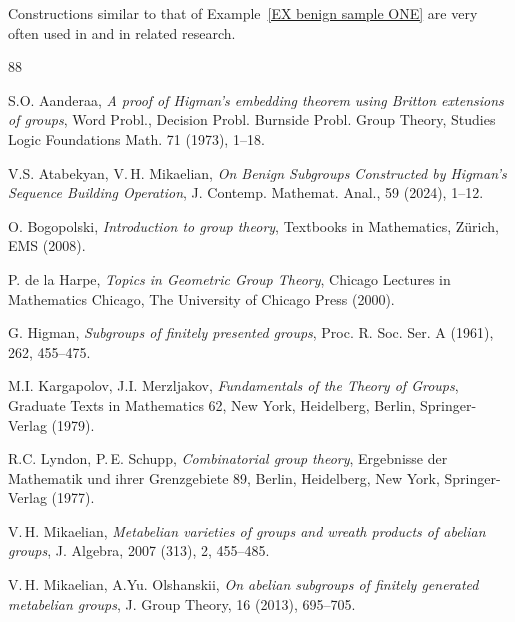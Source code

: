 \documentclass[12pt, a4paper]{amsart}
\newcommand{\1}{\{1\}}
\theoremstyle{plain}
\theoremstyle{definition}
\theoremstyle{remark}
\numberwithin{equation}{section}
\begin{document}
Constructions similar to that of
Example~\ref{EX benign sample ONE} are very often used in \cite{A modified proof for Higman, 
On explicit embeddings of Q,
An explicit algorithm} and in related research.


\vskip7mm


\begin{thebibliography}{88}

S.O. Aanderaa, 
\textit{A proof of Higman's embedding theorem using Britton extensions of groups},
Word Probl., Decision Probl. Burnside Probl. Group Theory, Studies Logic Foundations Math. 71 (1973), 1--18. 

V.S. Atabekyan, V.\,H. Mikaelian, 
\textit{On Benign Subgroups Constructed by Higman's Sequence Building Operation}, 
J. Contemp. Mathemat. Anal., 59 (2024), 1--12.


O. Bogopolski, 
\textit{Introduction to group theory}, Textbooks in Mathematics, Z{\"u}rich, EMS (2008). 

P. de la Harpe, 
\textit{Topics in Geometric Group Theory},
Chicago Lectures in Mathematics Chicago, The University of Chicago Press (2000).

G. Higman, 
{\it Subgroups of finitely presented groups}, Proc. R. Soc. Ser. A (1961), 262, 455--475.

M.I. Kargapolov, J.I. Merzljakov,
\textit{Fundamentals of the Theory of Groups},
Graduate Texts in Mathematics 62,
New York, Heidelberg, Berlin, Springer-Verlag (1979). 


R.C. Lyndon, P.\,E. Schupp, 
{\it Combinatorial group theory}, 
Ergebnisse der Mathematik und ihrer Grenzgebiete 89, Berlin, Heidelberg, New York, Springer-Verlag (1977). 


V.\,H. Mikaelian, 
\textit{Metabelian varieties of groups and wreath products of abelian groups}, J. Algebra, 2007 (313), 2, 455--485. 

V.\,H. Mikaelian, A.Yu. Olshanskii, 
\textit{On abelian subgroups of finitely generated metabelian groups}, J. Group Theory, 16 (2013), 695--705.

\end{thebibliography}
\end{document}
